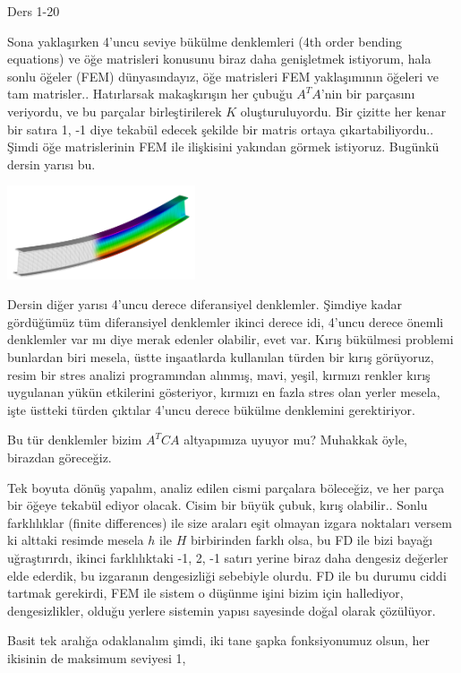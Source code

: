 \documentclass[12pt,fleqn]{article}\usepackage{../../common}
\begin{document}
Ders 1-20

Sona yaklaşırken 4'uncu seviye bükülme denklemleri (4th order bending equations)
ve öğe matrisleri konusunu biraz daha genişletmek istiyorum, hala sonlu öğeler
(FEM) dünyasındayız, öğe matrisleri FEM yaklaşımının öğeleri ve tam
matrisler.. Hatırlarsak makaşkırışın her çubuğu $A^T A$'nin bir parçasını
veriyordu, ve bu parçalar birleştirilerek $K$ oluşturuluyordu. Bir çizitte her
kenar bir satıra 1, -1 diye tekabül edecek şekilde bir matris ortaya
çıkartabiliyordu.. Şimdi öğe matrislerinin FEM ile ilişkisini yakından görmek
istiyoruz. Bugünkü dersin yarısı bu.

\includegraphics[width=15em]{compscieng_1_20_01.png}

Dersin diğer yarısı 4'uncu derece diferansiyel denklemler. Şimdiye kadar
gördüğümüz tüm diferansiyel denklemler ikinci derece idi, 4'uncu derece önemli
denklemler var mı diye merak edenler olabilir, evet var. Kırış bükülmesi
problemi bunlardan biri mesela, üstte inşaatlarda kullanılan türden bir kırış
görüyoruz, resim bir stres analizi programından alınmış, mavi, yeşil, kırmızı
renkler kırış uygulanan yükün etkilerini gösteriyor, kırmızı en fazla stres olan
yerler mesela, işte üstteki türden çıktılar 4'uncu derece bükülme denklemini
gerektiriyor.

Bu tür denklemler bizim $A^T C A$ altyapımıza uyuyor mu? Muhakkak öyle,
birazdan göreceğiz. 

Tek boyuta dönüş yapalım, analiz edilen cismi parçalara böleceğiz, ve her parça
bir öğeye tekabül ediyor olacak. Cisim bir büyük çubuk, kırış olabilir..  Sonlu
farklılıklar (finite differences) ile size araları eşit olmayan izgara noktaları
versem ki alttaki resimde mesela $h$ ile $H$ birbirinden farklı olsa, bu FD ile
bizi bayağı uğraştırırdı, ikinci farklılıktaki -1, 2, -1 satırı yerine biraz
daha dengesiz değerler elde ederdik, bu izgaranın dengesizliği sebebiyle
olurdu. FD ile bu durumu ciddi tartmak gerekirdi, FEM ile sistem o düşünme işini
bizim için hallediyor, dengesizlikler, olduğu yerlere sistemin yapısı
sayesinde doğal olarak çözülüyor. 

Basit tek aralığa odaklanalım şimdi, iki tane şapka fonksiyonumuz olsun, her
ikisinin de maksimum seviyesi 1,
\end{document}
